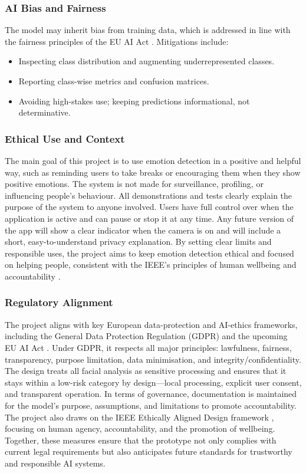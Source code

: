 \documentclass[12pt,a4paper]{article}
\begin{document}
\subsubsection{AI Bias and Fairness}
The model may inherit bias from training data, which is addressed in line with the fairness principles of the EU AI Act \cite{aiact}. Mitigations include:
\begin{itemize}
  \item Inspecting class distribution and augmenting underrepresented classes.
  \item Reporting class-wise metrics and confusion matrices.
  \item Avoiding high-stakes use; keeping predictions informational, not determinative.
\end{itemize}

\subsubsection{Ethical Use and Context}
The main goal of this project is to use emotion detection in a positive and helpful way, such as reminding users to take breaks or encouraging them when they show positive emotions. The system is not made for surveillance, profiling, or influencing people’s behaviour. All demonstrations and tests clearly explain the purpose of the system to anyone involved. Users have full control over when the application is active and can pause or stop it at any time. Any future version of the app will show a clear indicator when the camera is on and will include a short, easy-to-understand privacy explanation. By setting clear limits and responsible uses, the project aims to keep emotion detection ethical and focused on helping people, consistent with the IEEE’s principles of human wellbeing and accountability \cite{ieee}.

\subsubsection{Regulatory Alignment}
The project aligns with key European data-protection and AI-ethics frameworks, including the General Data Protection Regulation (GDPR) \cite{gdpr} and the upcoming EU AI Act \cite{aiact}. Under GDPR, it respects all major principles: lawfulness, fairness, transparency, purpose limitation, data minimisation, and integrity/confidentiality. The design treats all facial analysis as sensitive processing and ensures that it stays within a low-risk category by design—local processing, explicit user consent, and transparent operation. In terms of governance, documentation is maintained for the model’s purpose, assumptions, and limitations to promote accountability. The project also draws on the IEEE Ethically Aligned Design framework \cite{ieee}, focusing on human agency, accountability, and the promotion of wellbeing. Together, these measures ensure that the prototype not only complies with current legal requirements but also anticipates future standards for trustworthy and responsible AI systems.
\end{document}
